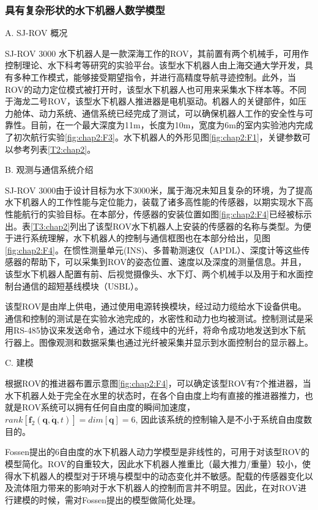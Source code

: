 \subsubsection{具有复杂形状的水下机器人数学模型 }

A. SJ-ROV 概况

SJ-ROV 3000 水下机器人是一款深海工作的ROV，其前置有两个机械手，可用作控制理论、水下科考等研究的实验平台。该型水下机器人由上海交通大学开发，具有多种工作模式，能够接受期望指令，并进行高精度导航寻迹控制\cite{lekkas2013line}。此外，当ROV的动力定位模式被打开时，该型水下机器人也可用来采集水下样本等。不同于海龙二号ROV\cite{xu2005deeprov,Huo2016Impulse}，该型水下机器人推进器是电机驱动。机器人的关键部件，如压力舱体、动力系统、通信系统已经完成了测试，可以确保机器人工作的安全性与可靠性。目前，在一个最大深度为11m，长度为10m，宽度为6m的室内实验池内完成了初次航行实验\ref{fig:chap2:F3}。水下机器人的外形见图\ref{fig:chap2:F1}，关键参数可以参考列表\ref{T2:chap2}。


B. 观测与通信系统介绍

SJ-ROV 3000由于设计目标为水下3000米，属于海况未知且复杂的环境，为了提高水下机器人的工作性能与定位能力，装载了诸多高性能的传感器，以期实现水下高性能航行的实验目标。在本部分，传感器的安装位置如图\ref{fig:chap2:F4}已经被标示出。表\ref{T3:chap2}列出了该型ROV水下机器人上安装的传感器的名称与类型。为便于进行系统理解，水下机器人的控制与通信框图也在本部分给出，见图\ref{fig:chap2:F4}。在惯性测量单元(INS)、多普勒测速仪（APDL）、深度计等这些传感器的帮助下，可以采集到ROV的姿态位置、速度以及深度的测量信息。并且，该型水下机器人配置有前、后视觉摄像头、水下灯、两个机械手以及用于和水面控制台通信的超短基线模块（USBL）。


该型ROV是由岸上供电，通过使用电源转换模块，经过动力缆给水下设备供电。通信和控制的测试是在实验水池完成的，水密性和动力也均被测试。控制测试是采用RS-485协议来发送命令，通过水下缆线中的光纤，将命令成功地发送到水下航行器上。图像观测和数据采集也通过光纤被采集并显示到水面控制台的显示器上。

C. 建模

根据ROV的推进器布置示意图\ref{fig:chap2:F4}，可以确定该型ROV有7个推进器，当水下机器人处于完全在水里的状态时，在各个自由度上均有直接的推进器推力，也就是ROV系统可以拥有任何自由度的瞬间加速度，${rank}[\bm{f}_2(\bm{q},{\dot{\bm{q}}},t)]=dim[\bm{q}] =6$, 因此该系统的控制输入是不小于系统自由度数目的。

Fossen提出的6自由度的水下机器人动力学模型是非线性的，可用于对该型ROV的模型简化。ROV的自重较大，因此水下机器人推重比（最大推力/重量）较小，使得水下机器人的模型对于环境与模型中的动态变化并不敏感。配载的传感器变化以及流体阻力带来的影响对于水下机器人的控制而言并不明显。因此，在对ROV进行建模的时候，需对Fossen提出的模型做简化处理。

